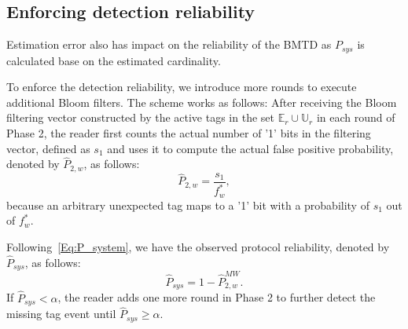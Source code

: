 \documentclass[10pt, twocolumn]{IEEEtran}
\begin{document}
\subsection{Enforcing detection reliability}

Estimation error also has impact on the reliability of the BMTD as $P_{sys}$ is calculated base on the estimated cardinality.


To enforce the detection reliability, we introduce more rounds to execute additional Bloom filters. The scheme works as follows: After receiving the Bloom filtering vector constructed by the active tags in the set $\mathbb{E}_r \cup \mathbb{U}_{r}$ in each round of Phase 2, the reader first counts the actual number of '1' bits in the filtering vector, defined as $s_1$ and uses it to compute the actual false positive probability, denoted by $\hat{P}_{2,w}$, as follows:
\begin{equation}
\hat{P}_{2,w} = \frac{s_1}{f^*_w},
\end{equation}
because an arbitrary unexpected tag maps to a '1' bit with a probability of $s_1$ out of $f^*_w$.

Following~\eqref{Eq:P_system}, we have the observed protocol reliability, denoted by $\hat P_{sys}$, as follows:
\begin{equation}
\hat P_{sys}=1- \hat P^{MW}_{2,w}.
\end{equation}
If $\hat P_{sys}<\alpha$, the reader adds one more round in Phase 2 to further detect the missing tag event until $\hat P_{sys} \ge \alpha$.
\end{document}
